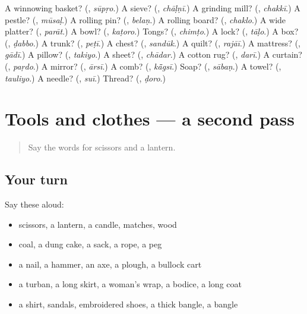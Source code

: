 \begin{tcolorbox}[breakable,colback=teal!4,colframe=teal!35!black,title={Before you move on}]
A winnowing basket? (\textbf{}, \emph{sūpṛo}.) A sieve? (\textbf{}, \emph{chāḷṇī}.) A grinding mill? (\textbf{}, \emph{chakkī}.) A pestle? (\textbf{}, \emph{mūsaḷ}.) A rolling pin? (\textbf{}, \emph{belaṇ}.) A rolling board? (\textbf{}, \emph{chaklo}.) A wide platter? (\textbf{}, \emph{parāt}.) A bowl? (\textbf{}, \emph{kaṭoro}.) Tongs? (\textbf{}, \emph{chimṭo}.) A lock? (\textbf{}, \emph{tāḷo}.) A box? (\textbf{}, \emph{ḍabbo}.) A trunk? (\textbf{}, \emph{peṭī}.) A chest? (\textbf{}, \emph{sandūk}.) A quilt? (\textbf{}, \emph{rajāī}.) A mattress? (\textbf{}, \emph{gādī}.) A pillow? (\textbf{}, \emph{takiyo}.) A sheet? (\textbf{}, \emph{chādar}.) A cotton rug? (\textbf{}, \emph{darī}.) A curtain? (\textbf{}, \emph{paṛdo}.) A mirror? (\textbf{}, \emph{ārsī}.) A comb? (\textbf{}, \emph{kā̃gsī}.) Soap? (\textbf{}, \emph{sābaṇ}.) A towel? (\textbf{}, \emph{tauliyo}.) A needle? (\textbf{}, \emph{suī}.) Thread? (\textbf{}, \emph{ḍoro}.)
\end{tcolorbox}
\section[(dialogue)]{Tools and clothes — a second pass}

\label{lesson:MW-R129-second-pass-tools-and-clothes}



\begin{quote}
Say the words for scissors and a lantern.
\end{quote}

\subsection*{Your turn}
Say these aloud:

\begin{itemize}
\raggedright
  \item scissors, a lantern, a candle, matches, wood
  \item coal, a dung cake, a sack, a rope, a peg
  \item a nail, a hammer, an axe, a plough, a bullock cart
  \item a turban, a long skirt, a woman's wrap, a bodice, a long coat
  \item a shirt, sandals, embroidered shoes, a thick bangle, a bangle
\end{itemize}

